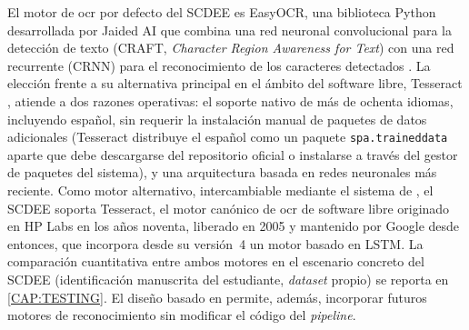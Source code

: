 El motor de \acs{ocr} por defecto del SCDEE es EasyOCR, una biblioteca
Python desarrollada por Jaided AI que combina una red neuronal
convolucional para la detección de texto (CRAFT, \textit{Character Region
Awareness for Text}) con una red recurrente (CRNN) para el reconocimiento
de los caracteres detectados \cite{easyocr}. La elección frente a su
alternativa principal en el ámbito del software libre, Tesseract
\cite{smith2007tesseract}, atiende a dos razones operativas: el soporte
nativo de más de ochenta idiomas, incluyendo español, sin requerir la
instalación manual de paquetes de datos adicionales (Tesseract distribuye
el español como un paquete \texttt{spa.traineddata} aparte que debe
descargarse del repositorio oficial o instalarse a través del gestor de
paquetes del sistema), y una arquitectura basada en redes neuronales más
reciente. Como motor alternativo, intercambiable mediante el sistema de
, el SCDEE soporta Tesseract, el motor canónico de \acs{ocr}
de software libre originado en HP Labs en los años noventa, liberado en
2005 y mantenido por Google desde entonces, que incorpora desde su
versión~4 un motor basado en LSTM. La comparación cuantitativa entre
ambos motores en el escenario concreto del SCDEE (identificación
manuscrita del estudiante, \textit{dataset} propio) se reporta en
\cref{CAP:TESTING}. El diseño basado en  permite, además,
incorporar futuros motores de reconocimiento sin modificar el código del
\textit{pipeline}.
